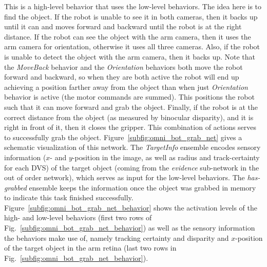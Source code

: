This is a high-level behavior that uses the low-level behaviors.
The idea here is to find the object. If the robot is unable to see it in both cameras, then it backs up until it can and moves forward and backward until the robot is at the right distance. 
If the robot can see the object with the arm camera, then it uses the arm camera for orientation, otherwise it uses all three cameras.
Also, if the robot is unable to detect the object with the arm camera, then it backs up. 
Note that the \emph{MoveBack} behavior and the \emph{Orientation} behaviors both move the robot forward and backward, so when they are both active the robot will end up achieving a position farther away from the object than when just \emph{Orientation} behavior is active (the motor commands are summed). 
This positions the robot such that it can move forward and grab the object. 
Finally, if the robot is at the correct distance from the object (as measured by binocular disparity), and it is right in front of it, then it closes the gripper. 
This combination of actions serves to successfully grab the object. 
Figure~\ref{subfig:omni_bot_grab_net} gives a schematic visualization of this network.
The \emph{TargetInfo} ensemble encodes sensory information ($x$- and $y$-position in the image, as well as radius and track-certainty for each \ac{DVS}) of the target object (coming from the \emph{evidence} sub-network in the out of order network), which serves as input for the low-level behaviors.
The \emph{has-grabbed} ensemble keeps the information once the object was grabbed in memory to indicate this task finished successfully.
Figure~\ref{subfig:omni_bot_grab_net_behavior} shows the activation levels of the high- and low-level behaviors (first two rows of Fig.~\ref{subfig:omni_bot_grab_net_behavior}) as well as the sensory information the behaviors make use of, namely tracking certainty and disparity and $x$-position of the target object in the arm retina (last two rows in Fig.~\ref{subfig:omni_bot_grab_net_behavior}). 

